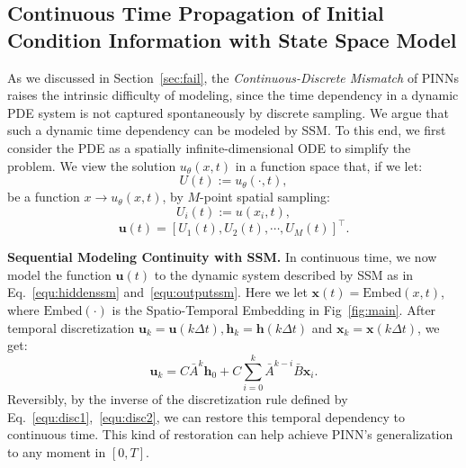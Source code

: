 \documentclass{article}
\theoremstyle{plain}
\theoremstyle{definition}
\theoremstyle{remark}
\begin{document}
\vspace{-2mm}


\subsection{Continuous Time Propagation of Initial Condition Information with State Space Model}
\vspace{-1mm}
\label{sec:ssm}
As we discussed in Section~\ref{sec:fail}, the \textit{Continuous-Discrete Mismatch} of PINNs raises the intrinsic difficulty of modeling, since the time dependency in a dynamic PDE system is not captured spontaneously by discrete sampling. 
    We argue that such a dynamic time dependency can be modeled by SSM. 
To this end, we first consider the PDE as a spatially infinite-dimensional ODE to simplify the problem. We view the solution $u_\theta(x,t)$ in a function space that, if we let:
\begin{equation}
    U(t) := u_\theta(\cdot,t),
\end{equation}
be a function $x \to u_\theta(x,t)$, by $M$-point spatial sampling:
\begin{equation}
    U_i(t) := u(x_i,t),
\end{equation}
\begin{equation}
    \mathbf {u}(t) = \left[U_1(t),U_2(t),\cdots,U_M(t) \right]^\top .
    \label{}
\end{equation}

\textbf{Sequential Modeling Continuity with SSM.}
In continuous time, we now model the function $\mathbf {u}(t)$ to the dynamic system described by SSM as in Eq.~\ref{equ:hiddenssm} and~\ref{equ:outputssm}. Here we let $\mathbf x(t) = \text{Embed}(x,t)$, where $\text{Embed}(\cdot)$ is the Spatio-Temporal Embedding in Fig~\ref{fig:main}. After temporal discretization $\mathbf u_k=\mathbf u(k\Delta t),\mathbf h_k=\mathbf h(k\Delta t)$ and $\mathbf x_k=\mathbf x(k\Delta t)$, we get: 
\begin{equation}
    \mathbf u_k=C\bar A^k \mathbf h_0 + C\sum_{i=0}^k\bar A^{k-i}\bar B\mathbf x_i.
    \label{equ:ssmu}
\end{equation}
Reversibly, by the inverse of the discretization rule defined by Eq.~\ref{equ:disc1},~\ref{equ:disc2}, we can restore this temporal dependency to continuous time. This kind of restoration can help achieve PINN's generalization to any moment in $[0, T]$. 
\end{document}
